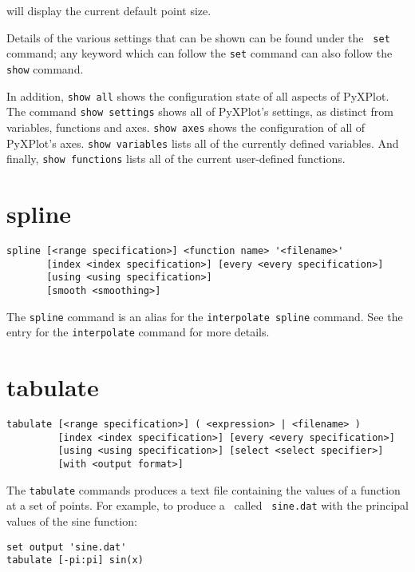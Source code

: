\noindent will display the current default point size.

Details of the various settings that can be shown can be found under the {\tt
set} command; any keyword which can follow the {\tt set} command can also follow
the {\tt show} command.

In addition, {\tt show all} shows the configuration state of all aspects of
PyXPlot. The command {\tt show settings} shows all of PyXPlot's settings, as
distinct from variables, functions and axes. {\tt show axes} shows the
configuration of all of PyXPlot's axes. {\tt show variables} lists all of the
currently defined variables. And finally, {\tt show functions} lists all of the
current user-defined functions.

\section{spline}

\begin{verbatim}
spline [<range specification>] <function name> '<filename>' 
       [index <index specification>] [every <every specification>]
       [using <using specification>]
       [smooth <smoothing>]
\end{verbatim}

The {\tt spline} command is an alias for the {\tt interpolate spline} command.
See the entry for the {\tt interpolate} command for more details.

\section{tabulate}

\begin{verbatim}
tabulate [<range specification>] ( <expression> | <filename> )
         [index <index specification>] [every <every specification>]
         [using <using specification>] [select <select specifier>]
         [with <output format>]
\end{verbatim}

The {\tt tabulate} commands produces a text file containing the values of a
function at a set of points.  For example, to produce a \datafile\ called {\tt
sine.dat} with the principal values of the sine function:

\begin{verbatim}
set output 'sine.dat'
tabulate [-pi:pi] sin(x)
\end{verbatim}

